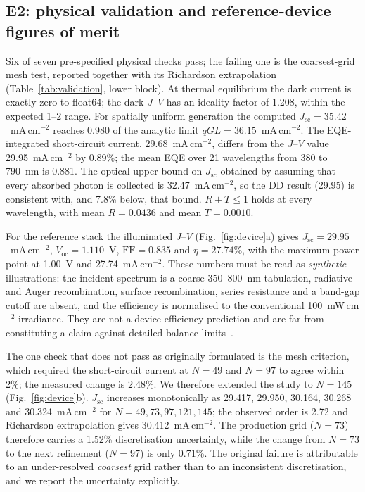\documentclass[preprint,12pt]{elsarticle}
\begin{document}
\subsection{E2: physical validation and reference-device figures of merit}
\label{sec:e2}

Six of seven pre-specified physical checks pass; the failing one is the
coarsest-grid mesh test, reported together with its Richardson
extrapolation (Table~\ref{tab:validation}, lower block). At thermal equilibrium the dark
current is exactly zero to float64; the dark $J$--$V$ has an ideality factor
of 1.208, within the expected 1--2 range. For spatially uniform generation
the computed $J_{\mathrm{sc}}=35.42$~mA\,cm$^{-2}$ reaches 0.980 of the
analytic limit $qGL=36.15$~mA\,cm$^{-2}$. The EQE-integrated short-circuit
current, 29.68~mA\,cm$^{-2}$, differs from the $J$--$V$ value
29.95~mA\,cm$^{-2}$ by 0.89\%; the mean EQE over 21 wavelengths from 380 to
790~nm is 0.881. The optical upper bound on $J_{\mathrm{sc}}$ obtained by
assuming that every absorbed photon is collected is 32.47~mA\,cm$^{-2}$, so
the DD result (29.95) is consistent with, and 7.8\% below, that bound.
$R+T\le1$ holds at every wavelength, with mean $R=0.0436$ and mean
$T=0.0010$.

For the reference stack the illuminated $J$--$V$
(Fig.~\ref{fig:device}a) gives $J_{\mathrm{sc}}=29.95$~mA\,cm$^{-2}$,
$V_{\mathrm{oc}}=1.110$~V, $\mathrm{FF}=0.835$ and
$\eta=27.74\%$, with the maximum-power point at 1.00~V and
27.74~mA\,cm$^{-2}$. These numbers must be read as \emph{synthetic}
illustrations: the incident spectrum is a coarse 350--800~nm tabulation,
radiative and Auger recombination, surface recombination, series resistance
and a band-gap cutoff are absent, and the efficiency is normalised to the
conventional 100~mW\,cm$^{-2}$ irradiance. They are not a device-efficiency
prediction and are far from constituting a claim against detailed-balance
limits~\cite{shockley1961, richter2013}.

The one check that does not pass as originally formulated is the mesh
criterion, which required the short-circuit current at $N=49$ and $N=97$ to
agree within 2\%; the measured change is 2.48\%. We therefore extended the
study to $N=145$ (Fig.~\ref{fig:device}b). $J_{\mathrm{sc}}$ increases
monotonically as 29.417, 29.950, 30.164, 30.268 and 30.324~mA\,cm$^{-2}$
for $N=49,73,97,121,145$; the observed order is 2.72 and Richardson
extrapolation gives 30.412~mA\,cm$^{-2}$. The production grid ($N=73$)
therefore carries a 1.52\% discretisation uncertainty, while the change from
$N=73$ to the next refinement ($N=97$) is only 0.71\%. The original failure
is attributable to an under-resolved \emph{coarsest} grid rather than to an
inconsistent discretisation, and we report the uncertainty explicitly.
\end{document}
